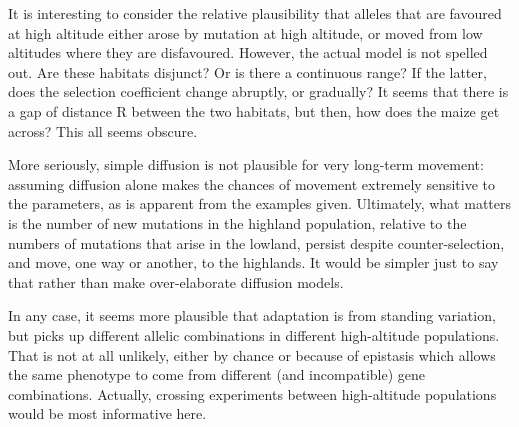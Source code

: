\documentclass[onecolumn,oneside,letterpaper]{article}
\begin{document}
It is interesting to consider the relative plausibility that alleles that are favoured at high altitude either arose by mutation at high altitude, 
or moved from low altitudes where they are disfavoured.  
However, the actual model is not spelled out.  
Are these habitats disjunct?  
Or is there a continuous range? 
If the latter, does the selection coefficient change abruptly, or gradually?  
It seems that there is a gap of distance R between the two habitats, but then, how does the maize get across?  
This all seems obscure. 


More seriously, simple diffusion is not plausible for very long-term movement: 
assuming diffusion alone makes the chances of movement extremely sensitive to the parameters, 
as is apparent from the examples given.  
Ultimately, what matters is the number of new mutations in the highland population, 
relative to the numbers of mutations that arise in the lowland, 
persist despite counter-selection, and move, one way or another, to the highlands.  
It would be simpler just to say that rather than make over-elaborate diffusion models. 


In any case, it seems more plausible that adaptation is from standing variation, but picks up different allelic combinations in different high-altitude populations.  That is not at all unlikely, either by chance or because of epistasis which allows the same phenotype to come from different (and incompatible) gene combinations.  Actually, crossing experiments between high-altitude populations would be most informative here. 
\end{document}
